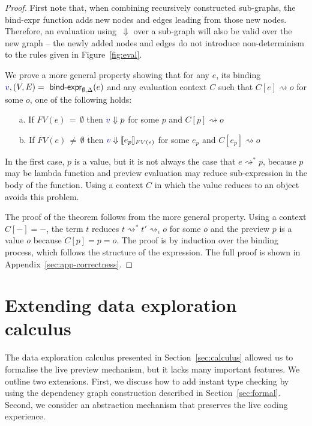 \documentclass[english,submission]{programming}
\theoremstyle{plain}
\theoremstyle{definition}
\newcommand{\ident}[1]{\textnormal{\textcolor{idclr}{\sffamily #1}}}
\newcommand{\bndclr}[1]{\textcolor{kvdclr}{#1}}
\begin{document}
\begin{proof}
First note that, when combining recursively constructed sub-graphs, the \ident{bind-expr} function
adds new nodes and edges leading from those new nodes. Therefore, an evaluation using~$\Downarrow$
over a sub-graph will also be valid over the new graph -- the newly added nodes and edges do not introduce
non-determinism to the rules given in Figure~\ref{fig:eval}.

We prove a more general property showing that for any $e$, its binding
$\bndclr{v}, (V, E) = \ident{bind-expr}_{\emptyset, \Delta}(e)$ and any evaluation context $C$
such that $C[e]\rightsquigarrow o$ for some $o$, one of the following holds:
%
\begin{enumerate}
\item[a.] If $FV(e)\,=\,\emptyset$ then $\bndclr{v} \Downarrow p$ for some $p$ and $C[p] \rightsquigarrow o$
\item[b.] If $FV(e)\,\neq\,\emptyset$ then $\bndclr{v} \Downarrow \llbracket e_p \rrbracket_{FV(e)}$ for some $e_p$ and $C[e_p] \rightsquigarrow o$
\end{enumerate}
%
In the first case, $p$ is a value, but it is not always the case that $e \rightsquigarrow^{*} p$,
because $p$ may be lambda function and preview evaluation may reduce sub-expression in the body of
the function. Using a context $C$ in which the value reduces to an object avoids this problem.

The proof of the theorem follows from the more general property. Using a context $C[-]=-$, the
term $t$ reduces $t \rightsquigarrow^{*}t' \rightsquigarrow_\epsilon o$ for some $o$ and the
preview $p$ is a value $o$ because $C[p] = p = o$.
The proof is by induction over the binding process, which follows the structure of the expression.
The full proof is shown in Appendix~\ref{sec:app-correctness}.
\end{proof}


\section{Extending data exploration calculus}
\label{sec:extra}

The data exploration calculus presented in Section~\ref{sec:calculus} allowed us to formalise the
live preview mechanism, but it lacks many important features. We outline two extensions.
First, we discuss how to add instant type checking by using the dependency graph construction
described in Section~\ref{sec:formal}. Second, we consider an abstraction mechanism that preserves
the live coding experience.
\end{document}

